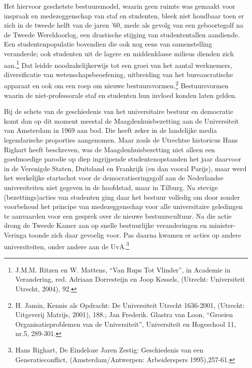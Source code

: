 \documentclass[empirical, authordate, ]{new-jote-article}
\begin{document}
	Het hiervoor geschetste bestuursmodel, waarin geen ruimte was gemaakt voor inspraak en medezeggenschap van staf en studenten, bleek niet houdbaar toen er zich in de tweede helft van de jaren '60, mede als gevolg van een geboortegolf na de Tweede Wereldoorlog, een drastische stijging van studententallen aandiende. Een studentenpopulatie bovendien die ook nog eens van samenstelling veranderde; ook studenten uit de lagere en middenklasse milieus dienden zich aan.\footnote{J.M.M. Ritzen en W. Mattens, “Van Rups Tot Vlinder”, in Academie in Verandering, red. Adriaan Dorresteijn en Joop Kessels, (Utrecht: Universiteit Utrecht, 2004), 92.} Dat leidde noodzakelijkerwijs tot een groei van het aantal werknemers, diversificatie van wetenschapsbeoefening, uitbreiding van het bureaucratische apparaat en ook om een roep om nieuwe bestuursvormen.\footnote{H. Jamin, Kennis als Opdracht: De Universiteit Utrecht 1636-2001, (Utrecht: Uitgeverij Matrijs, 2001), 188.; Jan Frederik. Glastra van Loon, “Groeien Organisatieproblemen van de Universiteit”, Universiteit en Hogeschool 11, nr.5, 289-301.} Bestuursvormen waarin de niet-professorale staf en studenten hun invloed konden laten gelden.



	Bij de schets van de geschiedenis van het universitaire bestuur en democratie komt dan op dit moment meestal de Maagdenhuisbezetting aan de Universiteit van Amsterdam in 1969 aan bod. Die heeft zeker in de landelijke media legendarische proporties aangenomen. Maar zoals de Utrechtse historicus Hans Righart heeft beschreven, was de Maagdenhuisbezetting niet alleen een goedmoedige parodie op diep ingrijpende studentenopstanden het jaar daarvoor in de Verenigde Staten, Duitsland en Frankrijk (en dan vooral Parijs), maar werd het werkelijke startschot voor de democratiseringsgolf aan de Nederlandse universiteiten niet gegeven in de hoofdstad, maar in Tilburg. Na stevige (bezettings)acties van studenten ging daar het bestuur volledig om door zonder voorbehoud het principe van medezeggenschap voor alle universitaire geledingen te aanvaarden voor een gesprek over de nieuwe bestuurscultuur. Na die actie drong de Tweede Kamer aan op snelle bestuurlijke veranderingen en minister-Veringa toonde zich daar gevoelig voor. Pas daarna kwamen er acties op andere universiteiten, onder andere aan de UvA.\footnote{Hans Righart, De Eindeloze Jaren Zestig: Geschiedenis van een Generatieconflict, (Amsterdam/Antwerpen: Arbeiderspers 1995),257-61.}
\end{document}
